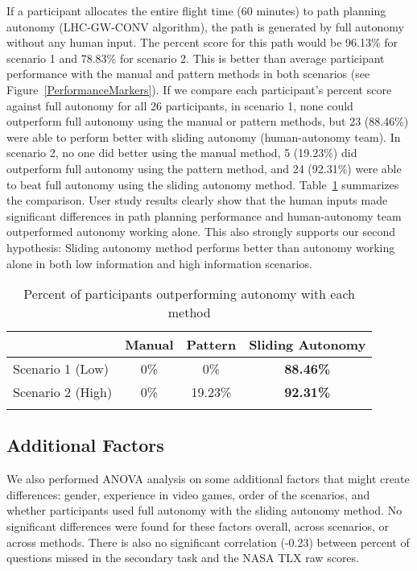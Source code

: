 If a participant allocates the entire flight time (60 minutes) to path planning autonomy (LHC-GW-CONV algorithm), the path is generated by full autonomy without any human input. The percent score for this path would be 96.13\% for scenario 1 and 78.83\% for scenario 2. This is better than average participant performance with the manual and pattern methods in both scenarios (see Figure~\ref{PerformanceMarkers}). If we compare each participant's percent score against full autonomy for all 26 participants, in scenario 1, none could outperform full autonomy using the manual or pattern methods, but 23 (88.46\%) were able to perform better with sliding autonomy (human-autonomy team). In scenario 2, no one did better using the manual method, 5 (19.23\%) did outperform full autonomy using the pattern method, and 24 (92.31\%) were able to beat full autonomy using the sliding autonomy method. Table~\ref{CompareToFullAutonomy} summarizes the comparison. User study results clearly show that the human inputs made significant differences in path planning performance and human-autonomy team outperformed autonomy working alone. This also strongly supports our second hypothesis: Sliding autonomy method performs better than autonomy working alone in both low information and high information scenarios.

\begin{table}
\caption{Percent of participants outperforming autonomy with each method}
	\centering
		\begin{tabular}
			{|l|c|c|c|}
			\hline
			 & Manual & Pattern & Sliding Autonomy \\
			\hline
			Scenario 1 (Low) & 0\% & 0\% & \textbf{88.46\%} \\
			\hline
			Scenario 2 (High) & 0\% & 19.23\% & \textbf{92.31\%} \\
			\hline			
			\multicolumn{4}{c}{}  %
		\end{tabular}
\label{CompareToFullAutonomy}
\end{table}

\subsection{Additional Factors}

We also performed ANOVA analysis on some additional factors that might create differences: gender, experience in video games, order of the scenarios, and whether participants used full autonomy with the sliding autonomy method. No significant differences were found for these factors overall, across scenarios, or across methods. There is also no significant correlation (-0.23) between percent of questions missed in the secondary task and the NASA TLX raw scores.


